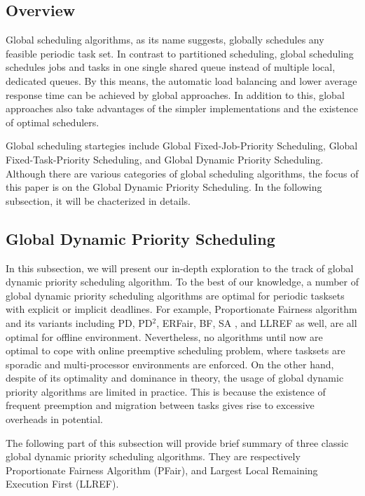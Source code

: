 \documentclass[preprint,12pt]{elsarticle}
\begin{document}
\subsection{Overview}
Global scheduling algorithms, as its name suggests, globally schedules any
feasible periodic task set. In contrast to partitioned scheduling, global
scheduling schedules jobs and tasks in one single shared queue instead of
multiple local, dedicated queues. By this means, the automatic load balancing
and lower average response time can be achieved by global approaches. In
addition to this, global approaches also take advantages of the simpler
implementations and the existence of optimal schedulers. 

Global scheduling startegies include Global Fixed-Job-Priority Scheduling,
Global Fixed-Task-Priority Scheduling, and Global Dynamic Priority Scheduling. 
Although there are various categories of global scheduling algorithms, the
focus of this paper is on the Global Dynamic Priority Scheduling. In the
following subsection, it will be chacterized in details. 

\subsection{Global Dynamic Priority Scheduling}
In this subsection, we will present our in-depth exploration to the track of
global dynamic priority scheduling algorithm. To the best of our knowledge, a
number of global dynamic priority scheduling algorithms are optimal for
periodic tasksets with explicit or implicit deadlines.
For example, Proportionate Fairness algorithm and its variants including PD,
PD$^2$, ERFair, BF, SA \cite{khemka1997optimal}, and LLREF
\cite{cho2006optimal} as well, are all optimal for offline environment.
Nevertheless, no algorithms until now are optimal to cope with online
preemptive scheduling problem, where tasksets are sporadic and multi-processor
environments are enforced.
On the other hand, despite of its optimality and dominance in theory, the
usage of global dynamic priority algorithms are limited in practice. This is
because the existence of frequent preemption and migration between tasks gives
rise to excessive overheads in potential. 

The following part of this subsection will provide brief summary of three
classic global dynamic priority scheduling algorithms. They are respectively 
Proportionate Fairness Algorithm (PFair), and Largest Local Remaining Execution
First (LLREF). 
\end{document}
